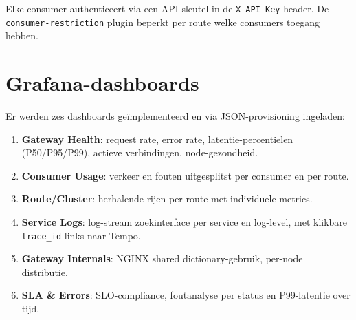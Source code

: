Elke consumer authenticeert via een API-sleutel in de \texttt{X-API-Key}-header. De \texttt{consumer-restriction} plugin beperkt per route welke consumers toegang hebben.

\section{Grafana-dashboards}%
\label{sec:dashboards}

Er werden zes dashboards geïmplementeerd en via JSON-provisioning ingeladen:

\begin{enumerate}
  \item \textbf{Gateway Health}: request rate, error rate, latentie-percentielen (P50/P95/P99), actieve verbindingen, node-gezondheid.
  \item \textbf{Consumer Usage}: verkeer en fouten uitgesplitst per consumer en per route.
  \item \textbf{Route/Cluster}: herhalende rijen per route met individuele metrics.
  \item \textbf{Service Logs}: log-stream zoekinterface per service en log-level, met klikbare \texttt{trace\_id}-links naar Tempo.
  \item \textbf{Gateway Internals}: NGINX shared dictionary-gebruik, per-node distributie.
  \item \textbf{SLA \& Errors}: SLO-compliance, foutanalyse per status en P99-latentie over tijd.
\end{enumerate}

